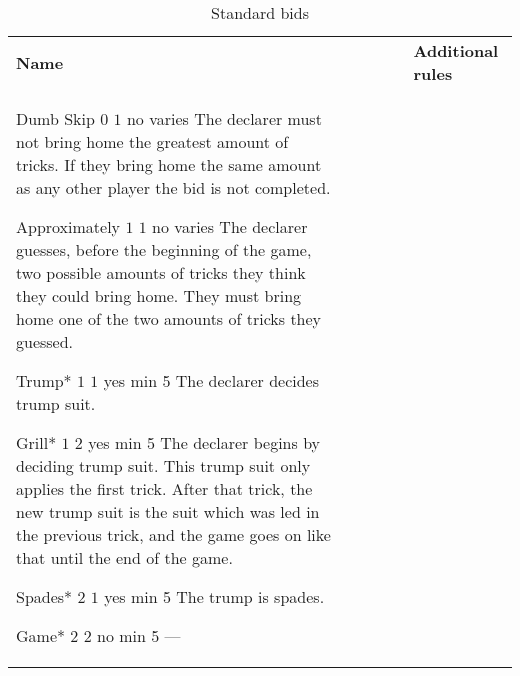 %
%
%

\begin{table}
	\caption{Standard bids}\label{tab:standardBids}
	\begin{center}
		\begin{tabularx}{\textwidth}{lcccc|X}
				\textbf{Name} &
				\rotccw{\textbf{Worth}} &
				\rotccw{\textbf{Score}} &
				\rotccw{\textbf{Trump}} &
				\rotccw{\textbf{Tricks}} &
				\textbf{Additional rules}
				\\[-3ex]

				\standardBidItem%
				{Dumb Skip}
				{$0$}
				{$1$}
				{no}
				{varies}
				{%
					The declarer must not bring home the greatest amount of tricks. If they bring home the same amount as any other player the bid is not completed.
				}

				\standardBidItem%
				{Approximately}
				{$1$}
				{$1$}
				{no}
				{varies}
				{%
					The declarer guesses, before the beginning of the game, two possible amounts of tricks they think they could bring home. They must bring home one of the two amounts of tricks they guessed.
				}

				\standardBidItem%
				{Trump*}
				{$1$}
				{$1$}
				{yes}
				{min 5}
				{%
					The declarer decides trump suit.
				}

				\standardBidItem%
				{Grill*}
				{$1$}
				{$2$}
				{yes}
				{min 5}
				{%
					The declarer begins by deciding trump suit. This trump suit only applies the first trick. After that trick, the new trump suit is the suit which was led in the previous trick, and the game goes on like that until the end of the game.
				}
				
				\standardBidItem%
				{Spades*}
				{$2$}
				{$1$}
				{yes}
				{min 5}
				{%
					The trump is spades.
				}

				\standardBidItem%
				{Game*}
				{$2$}
				{$2$}
				{no}
				{min 5}
				{%
					---
				}


\end{tabularx}
\end{center}
\end{table}
